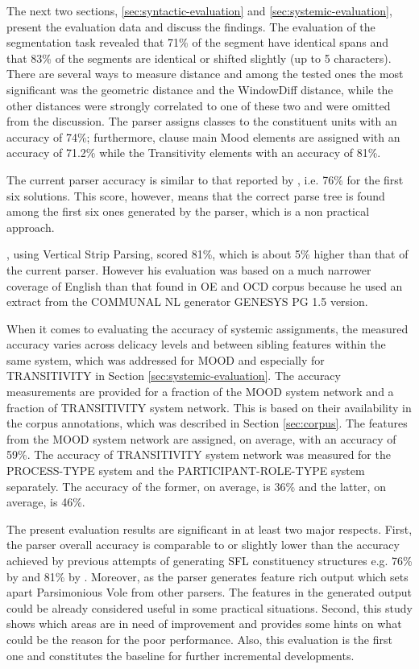     The next two sections, \ref{sec:syntactic-evaluation} and \ref{sec:systemic-evaluation}, present the evaluation data and discuss the findings. The evaluation of the segmentation task revealed that 71\% of the segment have identical spans and that 83\% of the segments are identical or shifted slightly (up to 5 characters). There are several ways to measure distance and among the tested ones the most significant was the geometric distance and the WindowDiff distance, while the other distances were strongly correlated to one of these two and were omitted from the discussion. 
    The parser assigns classes to the constituent units with an accuracy of 74\%; furthermore, clause main Mood elements are assigned with an accuracy of 71.2\% while the Transitivity elements with an accuracy of 81\%. 
    
    The current parser accuracy is similar to that reported by \citet{Souter1996}, i.e. 76\% for the first six solutions. This score, however, means that the correct parse tree is found among the first six ones generated by the parser, which is a non practical approach. 
    
    \citet{ODonoghue91}, using Vertical Strip Parsing, scored 81\%, which is about 5\% higher than that of the current parser. However his evaluation was based on a much narrower coverage of English than that found in OE and OCD corpus because he used an extract from the COMMUNAL NL generator GENESYS PG 1.5 version.
    
    When it comes to evaluating the accuracy of systemic assignments, the measured accuracy varies across delicacy levels and between sibling features within the same system, which was addressed for MOOD and especially for TRANSITIVITY in Section \ref{sec:systemic-evaluation}.
    The accuracy measurements are provided for a fraction of the MOOD system network and a fraction of TRANSITIVITY system network. This is based on their availability in the corpus annotations, which was described in Section \ref{sec:corpus}. The features from the MOOD system network are assigned, on average, with an accuracy of 59\%. The accuracy of TRANSITIVITY system network was measured for the PROCESS-TYPE system and the PARTICIPANT-ROLE-TYPE system separately. The accuracy of the former, on average, is 36\% and the latter, on average, is 46\%. 
    
    The present evaluation results are significant in at least two major respects. First, the parser overall accuracy is comparable to or slightly lower than the accuracy achieved by previous attempts of generating SFL constituency structures e.g. 76\% by \citet{Souter1996} and 81\% by \citet{ODonoghue91}.
    Moreover, as the parser generates feature rich output which sets apart Parsimonious Vole from other parsers. The features in the generated output could be already considered useful in some practical situations. 
    Second, this study shows which areas are in need of improvement and provides some hints on what could be the reason for the poor performance. Also, this evaluation is the first one and constitutes the baseline for further incremental developments.
    
